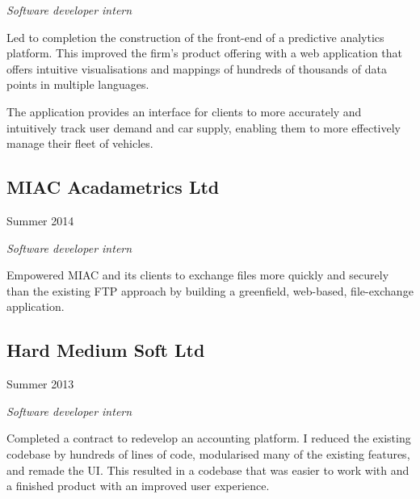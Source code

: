 \emph{Software developer intern}

{\small Led to completion the construction of the front-end of a predictive
  analytics platform. This improved the firm's product offering with a web
  application that offers intuitive visualisations and mappings of hundreds of
  thousands of data points in multiple languages.

  The application provides an interface for clients to more accurately and
  intuitively track user demand and car supply, enabling them to more
  effectively manage their fleet of vehicles. }

\vspace{1em}
\noindent\begin{minipage}[t]{0.5\textwidth}
  \subsection*{MIAC Acadametrics Ltd}
\end{minipage}
\noindent\begin{minipage}[t]{0.5\textwidth}
  \flushright
  Summer 2014
\end{minipage}

\emph{Software developer intern}

{\small Empowered MIAC and its clients to exchange files more quickly and
  securely than the existing FTP approach by building a greenfield, web-based,
  file-exchange application. }

\vspace{1em}
\noindent\begin{minipage}[t]{0.5\textwidth}
  \subsection*{Hard Medium Soft Ltd}
\end{minipage}
\noindent\begin{minipage}[t]{0.5\textwidth}
  \flushright
  Summer 2013
\end{minipage}

\emph{Software developer intern}

Completed a contract to redevelop an accounting platform. I reduced the existing
codebase by hundreds of lines of code, modularised many of the existing
features, and remade the UI. This resulted in a codebase that was easier to work
with and a finished product with an improved user experience.

